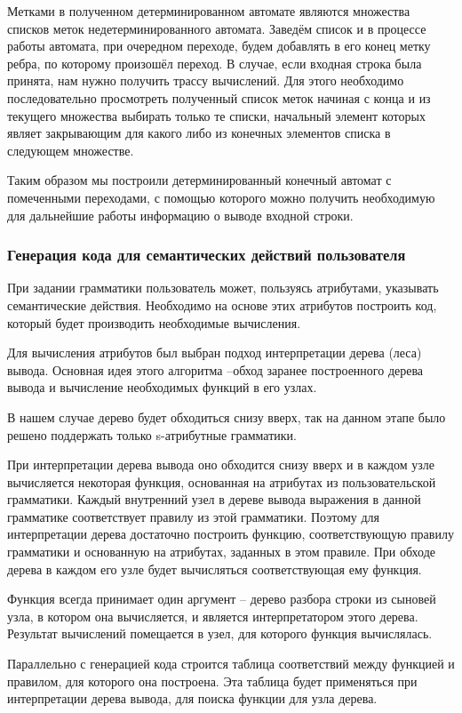 Метками в полученном детерминированном автомате являются множества списков меток недетерминированного автомата. Заведём список и в процессе работы автомата, при очередном переходе, будем добавлять в его конец метку ребра, по которому произошёл переход. В случае, если входная строка была принята, нам нужно получить трассу вычислений. Для этого необходимо последовательно просмотреть полученный список меток начиная с конца и из текущего множества выбирать только те списки, начальный элемент которых являет закрывающим для какого либо из конечных элементов списка в следующем множестве.

Таким образом мы построили детерминированный конечный автомат с помеченными переходами, с помощью которого можно получить необходимую для дальнейшие работы информацию о выводе входной строки.


\subsubsection{Генерация кода для семантических действий пользователя}

При задании грамматики пользователь может, пользуясь атрибутами, указывать семантические действия. Необходимо на основе этих атрибутов построить код, который будет производить необходимые вычисления.

Для вычисления атрибутов был выбран подход интерпретации дерева (леса) вывода. Основная идея этого алгоритма --обход заранее построенного дерева вывода и вычисление необходимых функций в его узлах.

В нашем случае дерево будет обходиться снизу вверх, так на данном этапе было решено поддержать только s-атрибутные грамматики. 

При интерпретации дерева вывода оно обходится снизу вверх и в каждом узле вычисляется некоторая функция, основанная на атрибутах из пользовательской грамматики. Каждый внутренний узел в дереве вывода выражения в данной грамматике соответствует правилу из этой грамматики. Поэтому для интерпретации дерева достаточно построить функцию, соответствующую правилу грамматики и основанную на атрибутах, заданных в этом правиле. При обходе дерева в каждом его узле будет вычисляться соответствующая ему функция.

Функция всегда принимает один аргумент -- дерево разбора строки из сыновей узла, в котором она вычисляется, и является интерпретатором этого дерева. Результат вычислений помещается в узел, для которого функция вычислялась.

Параллельно с генерацией кода строится таблица соответствий между функцией и правилом, для которого она построена. Эта таблица будет применяться при интерпретации дерева вывода, для поиска функции для узла дерева. 


